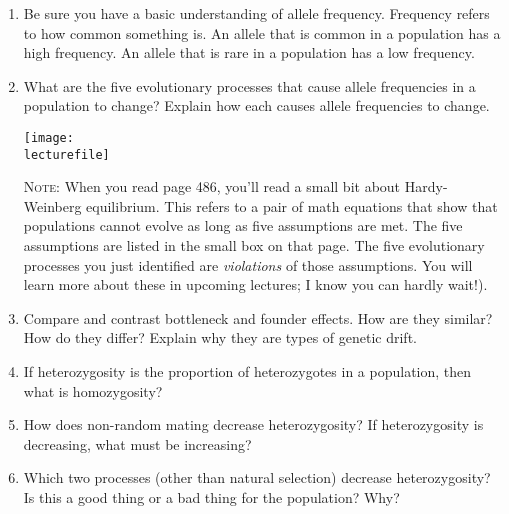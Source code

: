 \documentclass[letterpaper]{tufte-handout}
\newcommand\lecturefile{163_lecture06_fullsize}
\begin{document}
\begin{enumerate}

	\item Be sure you have a basic understanding of allele frequency.  Frequency refers to how common something is. An allele that is common in a population has a high frequency. An allele that is rare in a population has a low frequency.
	
	\item What are the five evolutionary processes that cause allele frequencies in a population to change?  Explain how each causes allele frequencies to change.
	
	\begin{marginfigure}[0.5in]
		\texttt{[image: \\lecturefile]}
	\end{marginfigure}

	\textsc{Note:} When you read page 486, you'll read a small bit about Hardy-Weinberg equilibrium. This refers to a pair of math equations that show that populations cannot evolve as long as five assumptions are met. The five assumptions are listed in the small box on that page. The five evolutionary processes you just identified are \emph{violations} of those assumptions. You will learn more about these in upcoming lectures; I know you can hardly wait!).
	

	\item Compare and contrast bottleneck and founder effects.  How are they similar?  How do they differ?  Explain why they are types of genetic drift.
		
	\item If heterozygosity is the proportion of heterozygotes in a population, then what is homozygosity?	
	
	\item How does non-random mating decrease heterozygosity? If heterozygosity is decreasing, what must be increasing?

	\item Which two processes (other than natural selection) decrease heterozygosity? Is this a good thing or a bad thing for the population? Why?
	

\end{enumerate}
\end{document}
